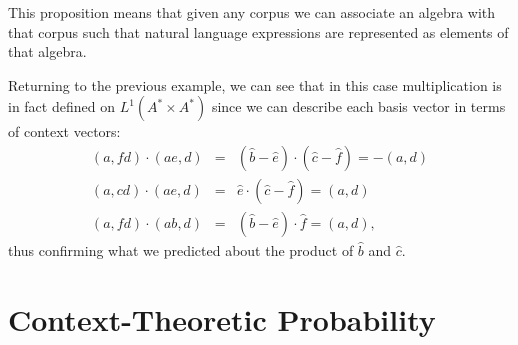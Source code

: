 \documentclass[11pt]{report}
\begin{document}
This proposition means that given any corpus we can associate an algebra with that corpus such that natural language expressions are represented as elements of that algebra.

Returning to the previous example, we can see that in this case multiplication is in fact defined on $L^1(A^*\times A^*)$ since we can describe each basis vector in terms of context vectors:
\begin{eqnarray*}
(a,fd)\cdot(ae,d) &=& (\hat{b} - \hat{e})\cdot(\hat{c} - \hat{f}) = -(a,d)\\
(a,cd)\cdot(ae,d) &=& \hat{e}\cdot(\hat{c} - \hat{f}) = (a,d)\\
(a,fd)\cdot(ab,d) &=& (\hat{b} - \hat{e})\cdot\hat{f} = (a,d),
\end{eqnarray*}
thus confirming what we predicted about the product of $\hat{b}$ and $\hat{c}$.


\section{Context-Theoretic Probability}
\end{document}
